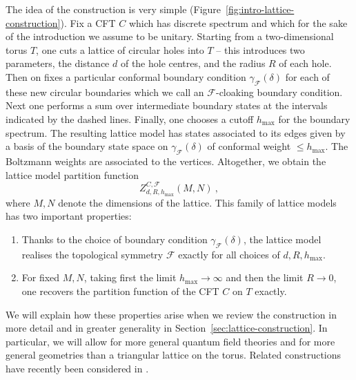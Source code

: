 \documentclass[11pt,a4paper]{article}
\numberwithin{equation}{section}
\begin{document}
The idea of the construction is very simple (Figure~\ref{fig:intro-lattice-construction}). Fix a CFT $C$ which has discrete spectrum and which for the sake of the introduction we assume to be unitary. Starting from a two-dimensional torus $T$, one cuts a lattice of circular holes into $T$ -- this introduces two parameters, the distance $d$ of the hole centres, and the radius $R$ of each hole. 
Then on fixes a particular conformal boundary condition $\gamma_\mathcal{F}(\delta)$ for each of these new circular boundaries which we call an $\mathcal{F}$-cloaking boundary condition. Next one performs a sum over intermediate boundary states at the intervals indicated by the dashed lines.
Finally, one chooses a cutoff $h_\text{max}$ for the boundary spectrum.
The resulting lattice model has states associated to its edges given by a basis of the boundary state space on $\gamma_\mathcal{F}(\delta)$ of conformal weight $\le h_\text{max}$. The Boltzmann weights are associated to the vertices. Altogether, we obtain the lattice model partition function
\begin{equation}
  Z^{C,\mathcal{F}}_{d,R,h_{\text{max}}}(M,N) \ , 
\end{equation}
where $M,N$ denote the dimensions of the lattice. This family of lattice models has two important properties:
\begin{enumerate}
    \item Thanks to the choice of boundary condition $\gamma_\mathcal{F}(\delta)$, the lattice model realises the topological symmetry $\mathcal{F}$ exactly for all choices of $d,R,h_{\text{max}}$.

    \item For fixed $M,N$, taking first the limit $h_{\text{max}} \to \infty$ and then the limit $R \to 0$, one recovers the partition function of the CFT $C$ on $T$ exactly.
\end{enumerate}
We will explain how these properties arise when we review the construction in more detail and in greater generality in Section~\ref{sec:lattice-construction}. In particular, we will allow for more general quantum field theories and for more general geometries than a triangular lattice on the torus. Related constructions have recently been considered in \cite{Sopenko:2023utk,Cheng:2023kxh,Hung:2024gma}.
\end{document}
